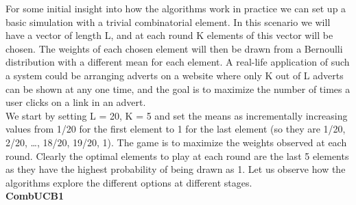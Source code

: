 For some initial insight into how the algorithms work in practice we can set up a basic simulation with a trivial combinatorial element. In this scenario we will have a vector of length L, and at each round K elements of this vector will be chosen. The weights of each chosen element will then be drawn from a Bernoulli distribution with a different mean for each element. A real-life application of such a system could be arranging adverts on a website where only K out of L adverts can be shown at any one time, and the goal is to maximize the number of times a user clicks on a link in an advert.\\

We start by setting L = 20, K = 5 and set the means as incrementally increasing values from 1/20 for the first element to 1 for the last element (so they are 1/20, 2/20, \ldots, 18/20, 19/20, 1). The game is to maximize the weights observed at each round. Clearly the optimal elements to play at each round are the last 5 elements as they have the highest probability of being drawn as 1. Let us observe how the algorithms explore the different options at different stages.\\


\noindent \textbf{CombUCB1}\\



